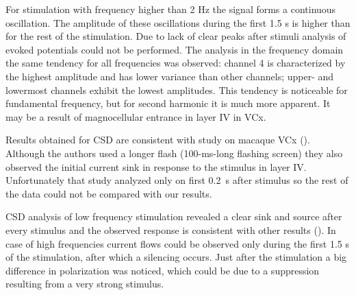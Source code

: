 \documentclass{pracalicmgr}
\begin{document}
    For stimulation with frequency higher than 2 Hz the signal forms a continuous oscillation. The amplitude of these oscillations during the first 1.5 s is higher than for the rest of the stimulation. Due to lack of clear peaks after stimuli analysis of evoked potentials could not be performed. The analysis in the frequency domain the same tendency for all frequencies was observed: channel 4 is characterized by the highest amplitude and has lower variance than other channels; upper- and lowermost channels exhibit the lowest amplitudes. This tendency is noticeable for fundamental frequency, but for second harmonic it is much more apparent. It may be a result of magnocellular entrance in layer IV in VCx.
    
    Results obtained for CSD are consistent with study on macaque VCx (\cite{maier2011}). Although the authors used a longer flash (100-ms-long flashing screen) they also observed the initial current sink in response to the stimulus in layer IV. Unfortunately that study analyzed only on first 0.2~s after stimulus so the rest of the data could not be compared with our results. 
    
    CSD analysis of low frequency stimulation revealed a clear sink and source after every stimulus and the observed response is consistent with other results (\cite{kozai, maier2010}). In case of high frequencies current flows could be observed only during the first 1.5 s of the stimulation, after which a silencing occurs. Just after the stimulation a big difference in polarization was noticed, which could be due to a suppression resulting from a very strong stimulus.
    

\printbibliography[heading=bibintoc]
\end{document}
